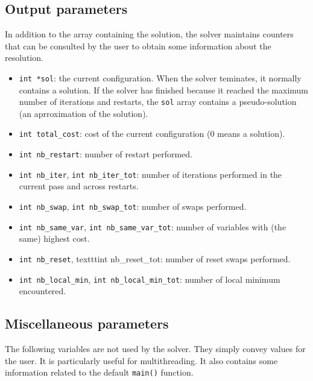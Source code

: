 \documentclass{article}
\begin{document}
\subsection{Output parameters}

In addition to the array containing the solution, the solver maintains
counters that can be consulted by the user to obtain some information about
the resolution.

\begin{itemize}

\item \texttt{int *sol}: the current configuration. When the solver
  teminates, it normally contains a solution. If the solver has finished
  because it reached the maximum number of iterations and restarts, the
  \texttt{sol} array contains a pseudo-solution (an aprroximation of the
  solution).

\item \texttt{int total\_cost}: cost of the current configuration (0 means a
  solution).

\item \texttt{int nb\_restart}: number of restart performed.

\item \texttt{int nb\_iter}, \texttt{int nb\_iter\_tot}: number of iterations performed in the current
  pass and across restarts.

\item \texttt{int nb\_swap}, \texttt{int nb\_swap\_tot}: number of swaps performed.

\item \texttt{int nb\_same\_var}, \texttt{int nb\_same\_var\_tot}: number of
  variables with (the same) highest cost.

\item \texttt{int nb\_reset}, texttt{int nb\_reset\_tot}: number of reset swaps performed.

\item \texttt{int nb\_local\_min}, \texttt{int nb\_local\_min\_tot}: number of local minimum encountered.

\end{itemize}


\subsection{Miscellaneous parameters}

The following variables are not used by the solver. They simply convey values
for the user. It is particularly useful for multithreading. It also contains
some information related to the default \texttt{main()} function.
\end{document}
